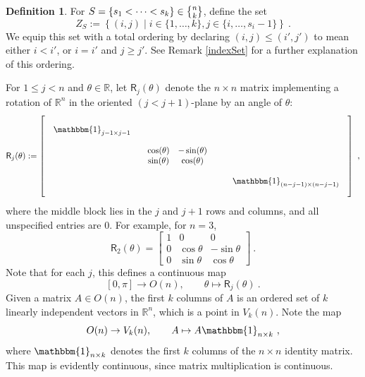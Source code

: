 \documentclass{article}
\newcommand{\bb}[1]{\mathbb{#1}}
\newcommand{\msf}[1]{\mathsf{#1}}
\newcommand{\nchoosek}{\textstyle\genfrac{\lbrace}{\rbrace}{0pt}{}}
\newcommand{\R}{\msf{R}}
\newcommand{\uno}{\mathbbm{1}}
\theoremstyle{definition}
\newtheorem{definition}[theorem]{Definition}
\begin{document}
\begin{definition}
For $S=\{s_1< \cdots < s_k\} \in \nchoosek{n}{k}$,
        define the set 
        $$Z_S:=\left\{(i,j)\mid i\in\{1,\dots,k\}, j\in \{i,\dots,s_i-1\}\right\}~.$$
        We equip this set with a total ordering by declaring $(i,j) \le (i',j')$ to mean either $i < i'$, or $i=i'$ and
        $j \ge j'$. See Remark \ref{indexSet} for a further explanation of this ordering.
\end{definition}

For $1 \le j < n$ and $\theta \in \bb{R}$, let $\R_j(\theta)$ denote the $n \times n$ matrix implementing
a rotation of $\bb{R}^n$ in the oriented $(j<j+1)$-plane by an angle of $\theta$:
$$\R_j(\theta):=\begin{bmatrix}
    &&&&&&&&\\
    &\uno_{j-1\times j-1} &&&&&&&\\
    &&&&&&&&\\
    &&&\cos(\theta)&-\sin(\theta)&&&&\\
    &&&\sin(\theta)&\cos(\theta)&&&&\\
    &&&&&&&&\\
    &&&&&&&\uno_{(n-j-1)\times(n-j-1)}&\\
    &&&&&&&&  
    \end{bmatrix}~,$$
where the middle block lies in the $j$ and $j+1$ rows and columns, and all unspecified entries are 0.
For example, for $n=3$,
$$\R_2(\theta) = \begin{bmatrix} 1 & 0 & 0 \\ 0 & \cos\theta & -\sin\theta \\ 0 & \sin\theta & \cos\theta 
                                  \end{bmatrix}~.$$
Note that for each $j$, this defines a continuous map 
$$[0,\pi] \to O(n), \qquad \theta \mapsto \R_j(\theta)~.$$
Given a matrix $A \in O(n)$, the first $k$ columns of $A$ is an ordered set of $k$ linearly independent vectors in 
$\bb{R}^n$, which is a point in $V_k(n)$.
Note the map
$$O(n) \to V_k(n), \qquad A \mapsto A\uno_{n\times k}~,$$
where $\uno_{n\times k}$ denotes the first $k$ columns of the $n\times n$ identity matrix. This map is 
evidently continuous, since matrix multiplication is continuous. \\
\end{document}
